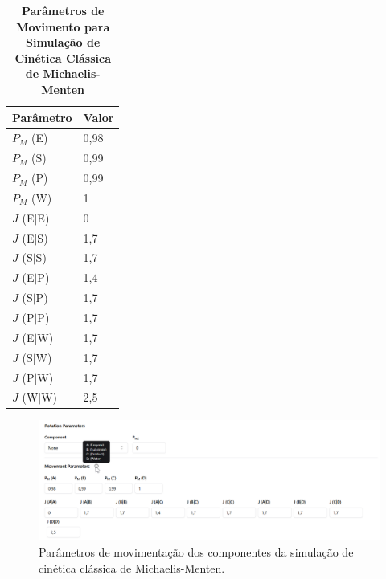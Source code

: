 \documentclass[12pt,oneside]{report}
\begin{document}
\begin{table}[H]
    \centering
    \caption{\textbf{Parâmetros de Movimento para Simulação de Cinética Clássica de Michaelis-Menten}}
    \vspace{0.2cm}
    \begin{tabularx}{\textwidth}{X m{5cm}}
        \hline
        \textbf{Parâmetro} & \textbf{Valor} \\
        \hline
        $P_M$ (E)          & 0{,}98         \\
        $P_M$ (S)          & 0{,}99         \\
        $P_M$ (P)          & 0{,}99         \\
        $P_M$ (W)          & 1              \\
        $J$ (E$|$E)        & 0              \\
        $J$ (E$|$S)        & 1{,}7          \\
        $J$ (S$|$S)        & 1{,}7          \\
        $J$ (E$|$P)        & 1{,}4          \\
        $J$ (S$|$P)        & 1{,}7          \\
        $J$ (P$|$P)        & 1{,}7          \\
        $J$ (E$|$W)        & 1{,}7          \\
        $J$ (S$|$W)        & 1{,}7          \\
        $J$ (P$|$W)        & 1{,}7          \\
        $J$ (W$|$W)        & 2{,}5          \\
        \hline
    \end{tabularx}
    \vspace{0.2cm}
    \label{tab:params_movimento}
\end{table}

\begin{figure}[H]
    \centering
    \includegraphics[width=1\textwidth]{movement_MM.png}
    \caption{\small Parâmetros de movimentação dos componentes da simulação de cinética clássica de Michaelis-Menten.}
    \label{fig:michaelis_menten_movement}
\end{figure}
\end{document}
